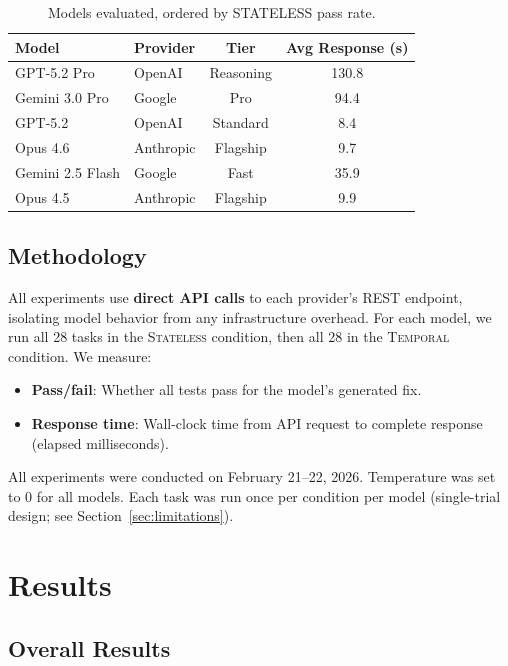\documentclass[11pt]{article}
\begin{document}
\begin{table}[ht]
\centering
\caption{Models evaluated, ordered by STATELESS pass rate.}
\label{tab:models}
\begin{tabular}{llcc}
\toprule
\textbf{Model} & \textbf{Provider} & \textbf{Tier} & \textbf{Avg Response (s)} \\
\midrule
GPT-5.2 Pro & OpenAI & Reasoning & 130.8 \\
Gemini 3.0 Pro & Google & Pro & 94.4 \\
GPT-5.2 & OpenAI & Standard & 8.4 \\
Opus 4.6 & Anthropic & Flagship & 9.7 \\
Gemini 2.5 Flash & Google & Fast & 35.9 \\
Opus 4.5 & Anthropic & Flagship & 9.9 \\
\bottomrule
\end{tabular}
\end{table}

\subsection{Methodology}

All experiments use \textbf{direct API calls} to each provider's REST endpoint, isolating model behavior from any infrastructure overhead. For each model, we run all 28 tasks in the \textsc{Stateless} condition, then all 28 in the \textsc{Temporal} condition. We measure:
\begin{itemize}[nosep]
    \item \textbf{Pass/fail}: Whether all tests pass for the model's generated fix.
    \item \textbf{Response time}: Wall-clock time from API request to complete response (elapsed milliseconds).
\end{itemize}

All experiments were conducted on February 21--22, 2026. Temperature was set to 0 for all models. Each task was run once per condition per model (single-trial design; see Section~\ref{sec:limitations}).

\section{Results}
\label{sec:results}

\subsection{Overall Results}
\end{document}
